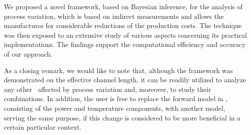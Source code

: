 We proposed a novel framework, based on Bayesian inference, for the analysis of process variation, which is based on indirect measurements and allows the manufactures for considerable reductions of the production costs. The technique was then exposed to an extensive study of various aspects concerning its practical implementations. The findings support the computational efficiency and accuracy of our approach.

As a closing remark, we would like to note that, although the framework was demonstrated on the effective channel length, it can be readily utilized to analyze any other \qois\ affected by process variation and, moreover, to study their combinations. In addition, the user is free to replace the forward model in , consisting of the power and temperature components, with another model, serving the same purpose, if this change is considered to be more beneficial in a certain particular context.
